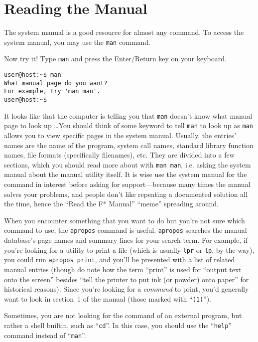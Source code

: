 \documentclass{extbook}
\begin{document}
\section{Reading the Manual}

The system manual is a good resource for almost any command. To access the system manual, you may use the \verb|man| command.

Now try it!  Type \verb|man| and press the Enter/Return key on your keyboard.
\begin{verbatim}
user@host:~$ man
What manual page do you want?
For example, try 'man man'.
user@host:~$
\end{verbatim}

It looks like that the computer is telling you that \verb|man| doesn't know what manual page to look up \ldots You should think of some keyword to tell \verb|man| to look up as \verb|man| allows you to view specific pages in the system manual. Usually, the entries' names are the name of the program, system call names, standard library function names, file formats (specifically filenames), etc. They are divided into a few sections, which you should read more about with \verb|man man|, i.e. asking the system manual about the manual utility itself. It is wise use the system manual for the command in interest before asking for support---because many times the manual solves your problems, and people don't like repeating a documented solution all the time, hence the ``Read the F* Manual'' ``meme'' spreading around.

When you encounter something that you want to do but you're not sure which command to use, the \verb|apropos| command is useful. \verb|apropos| searches the manual database's page names and summary lines for your search term. For example, if you're looking for a utility to print a file (which is usually \verb|lpr| or \verb|lp|, by the way), you could run \verb|apropos print|, and you'll be presented with a list of related manual entries (though do note how the term ``print'' is used for ``output text onto the screen'' besides ``tell the printer to put ink (or powder) onto paper'' for historical reasons). Since you're looking for a \emph{command} to print, you'd generally want to look in section~1 of the manual (those marked with ``\verb|(1)|'').

Sometimes, you are not looking for the command of an external program, but rather a shell builtin, such as ``\verb|cd|''. In this case, you should use the ``\verb|help|'' command instead of ``\verb|man|''.
\end{document}
